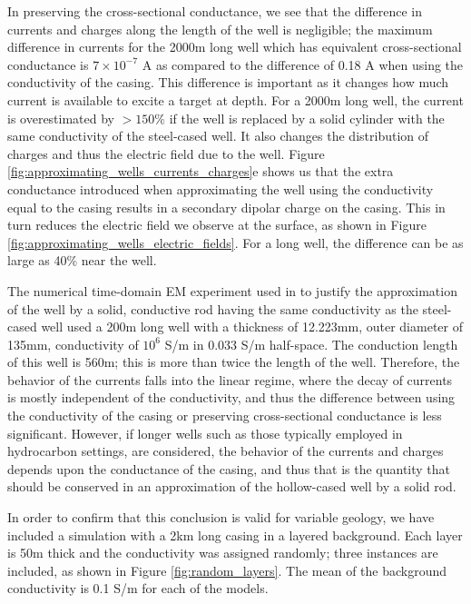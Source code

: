 In preserving the cross-sectional conductance, we see that the difference in currents and charges along the length of the well is negligible;  the maximum difference in currents for the 2000m long well which has equivalent cross-sectional conductance is $7\times10^{-7}$ A as compared to the difference of 0.18 A when using the conductivity of the casing. This difference is important as it changes how much current is available to excite a target at depth. For a 2000m long well, the current is overestimated by $> 150\%$ if the well is replaced by a solid cylinder with the same conductivity of the steel-cased well. It also changes the distribution of charges and thus the electric field due to the well. Figure \ref{fig:approximating_wells_currents_charges}e shows us that the extra conductance introduced when approximating the well using the conductivity equal to the casing results in a secondary dipolar charge on the casing. This in turn reduces the electric field we observe at the surface, as shown in Figure \ref{fig:approximating_wells_electric_fields}. For a long well, the difference can be as large as 40\% near the well.



The numerical time-domain EM experiment used in \cite{Um2015} to justify the approximation of the well by a solid, conductive rod having the same conductivity as the steel-cased well used a 200m long well with a thickness of 12.223mm, outer diameter of 135mm, conductivity of $10^{6}$ S/m in 0.033 S/m half-space. The conduction length of this well is 560m; this is more than twice the length of the well. Therefore, the behavior of the currents falls into the linear regime, where the decay of currents is mostly independent of the conductivity, and thus the difference between using the conductivity of the casing or preserving cross-sectional conductance is less significant. However, if longer wells such as those typically employed in hydrocarbon settings, are considered, the behavior of the currents and charges depends upon the conductance of the casing, and thus that is the quantity that should be conserved in an approximation of the hollow-cased well by a solid rod.

In order to confirm that this conclusion is valid for variable geology, we have included a simulation with a 2km long casing in a layered background. Each layer is 50m thick and the conductivity was assigned randomly; three instances are included, as shown in Figure \ref{fig:random_layers}. The mean of the background conductivity is 0.1 S/m for each of the models.

